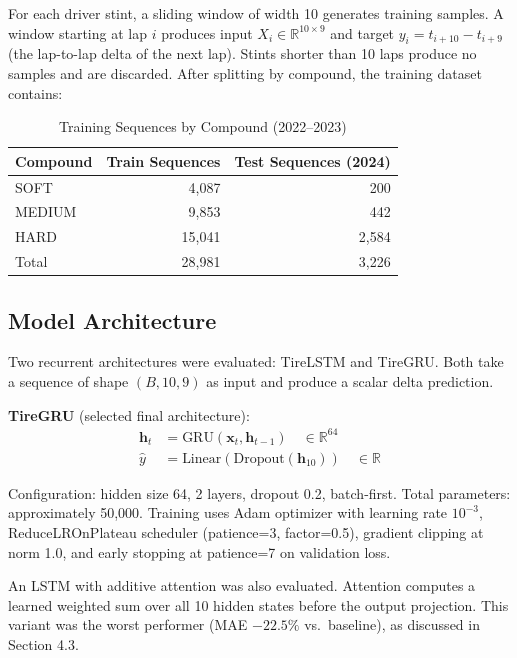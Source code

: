 \documentclass[12pt]{article}
\begin{document}
For each driver stint, a sliding window of width 10 generates training samples. A window starting at lap $i$ produces input $X_i \in \mathbb{R}^{10 \times 9}$ and target $y_i = t_{i+10} - t_{i+9}$ (the lap-to-lap delta of the next lap). Stints shorter than 10 laps produce no samples and are discarded. After splitting by compound, the training dataset contains:

\begin{table}[h]
\centering
\caption{Training Sequences by Compound (2022--2023)}
\begin{tabular}{lrr}
\toprule
Compound & Train Sequences & Test Sequences (2024) \\
\midrule
SOFT   & 4,087  & 200 \\
MEDIUM & 9,853  & 442 \\
HARD   & 15,041 & 2,584 \\
\midrule
Total  & 28,981 & 3,226 \\
\bottomrule
\end{tabular}
\end{table}

\subsection{Model Architecture}

Two recurrent architectures were evaluated: TireLSTM and TireGRU. Both take a sequence of shape $(B, 10, 9)$ as input and produce a scalar delta prediction.

\textbf{TireGRU} (selected final architecture):
\begin{align}
\mathbf{h}_t &= \text{GRU}(\mathbf{x}_t, \mathbf{h}_{t-1}) \quad \in \mathbb{R}^{64} \\
\hat{y} &= \text{Linear}(\text{Dropout}(\mathbf{h}_{10})) \quad \in \mathbb{R}
\end{align}

Configuration: hidden size 64, 2 layers, dropout 0.2, batch-first. Total parameters: approximately 50,000. Training uses Adam optimizer \cite{kingma2015} with learning rate $10^{-3}$, ReduceLROnPlateau scheduler (patience=3, factor=0.5), gradient clipping at norm 1.0, and early stopping at patience=7 on validation loss.

An LSTM with additive attention \cite{bahdanau2015} was also evaluated. Attention computes a learned weighted sum over all 10 hidden states before the output projection. This variant was the worst performer (MAE $-22.5\%$ vs.\ baseline), as discussed in Section 4.3.
\end{document}
